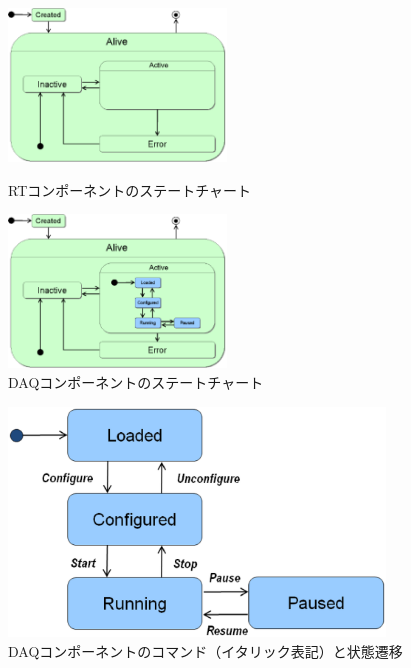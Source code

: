 \documentclass[a4j,10pt,dvips,onecolumn,oneside,final]{jarticle}%
\begin{document}
\begin{figure}[htbp]
 \begin{minipage}{0.48\hsize}
  \begin{center}
   \includegraphics[width=58mm]{rtc-state.eps}
  \end{center}
  \caption{RTコンポーネントのステートチャート}
  \label{rtc-state.fig}
 \end{minipage}
\hfill
 \begin{minipage}{0.48\hsize}
  \begin{center}
   \includegraphics[width=58mm]{daq-state.eps}
  \end{center}
  \caption{DAQコンポーネントのステートチャート}
  \label{daq-state.fig}
 \end{minipage}
\end{figure}
 \begin{figure}[h]
   \vspace{-5mm}
  \begin{center}
   \includegraphics[width=100mm]{daq-state-only.eps}
   \vspace{-5mm}
   \caption{DAQコンポーネントのコマンド（イタリック表記）と状態遷移}
  \label{command-state.fig}
  \end{center}
 \end{figure}
\end{document}
